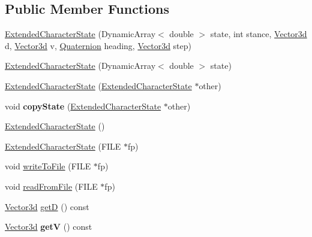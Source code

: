 \subsection*{Public Member Functions}
\begin{DoxyCompactItemize}
\item 
\hyperlink{classCartWheel_1_1Core_1_1ExtendedCharacterState_a4f951ea8ca2f0ff694af5439e0e6030c}{ExtendedCharacterState} (DynamicArray$<$ double $>$ state, int stance, \hyperlink{classCartWheel_1_1Math_1_1Vector3d}{Vector3d} d, \hyperlink{classCartWheel_1_1Math_1_1Vector3d}{Vector3d} v, \hyperlink{classCartWheel_1_1Math_1_1Quaternion}{Quaternion} heading, \hyperlink{classCartWheel_1_1Math_1_1Vector3d}{Vector3d} step)
\item 
\hyperlink{classCartWheel_1_1Core_1_1ExtendedCharacterState_a94179157b4265c585e83db25186740d3}{ExtendedCharacterState} (DynamicArray$<$ double $>$ state)
\item 
\hyperlink{classCartWheel_1_1Core_1_1ExtendedCharacterState_af5c2f7196eb4522932e5172a6e4e606d}{ExtendedCharacterState} (\hyperlink{classCartWheel_1_1Core_1_1ExtendedCharacterState}{ExtendedCharacterState} $\ast$other)
\item 
\hypertarget{classCartWheel_1_1Core_1_1ExtendedCharacterState_ab1ff767e719d85b20b41063600047187}{
void {\bfseries copyState} (\hyperlink{classCartWheel_1_1Core_1_1ExtendedCharacterState}{ExtendedCharacterState} $\ast$other)}
\label{classCartWheel_1_1Core_1_1ExtendedCharacterState_ab1ff767e719d85b20b41063600047187}

\item 
\hyperlink{classCartWheel_1_1Core_1_1ExtendedCharacterState_a81f90c3c340e4d31aad8e0f4a8b4d1e2}{ExtendedCharacterState} ()
\item 
\hyperlink{classCartWheel_1_1Core_1_1ExtendedCharacterState_aaf81412a6e91027525164060b345886e}{ExtendedCharacterState} (FILE $\ast$fp)
\item 
void \hyperlink{classCartWheel_1_1Core_1_1ExtendedCharacterState_a82277255cfb173c32ca71924bd4ad182}{writeToFile} (FILE $\ast$fp)
\item 
void \hyperlink{classCartWheel_1_1Core_1_1ExtendedCharacterState_a7a489a53e814aeaca4309ab1d5ae108b}{readFromFile} (FILE $\ast$fp)
\item 
\hyperlink{classCartWheel_1_1Math_1_1Vector3d}{Vector3d} \hyperlink{classCartWheel_1_1Core_1_1ExtendedCharacterState_ac389585b887f42c16427489f8c26644d}{getD} () const 
\item 
\hypertarget{classCartWheel_1_1Core_1_1ExtendedCharacterState_ab61050e5b9ad68050339f460b47cc2cb}{
\hyperlink{classCartWheel_1_1Math_1_1Vector3d}{Vector3d} {\bfseries getV} () const }
\label{classCartWheel_1_1Core_1_1ExtendedCharacterState_ab61050e5b9ad68050339f460b47cc2cb}


\end{DoxyCompactItemize}
